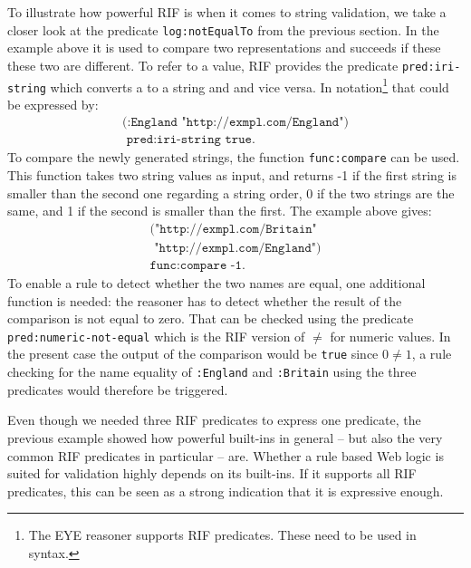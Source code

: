 To illustrate  how powerful RIF is when it comes to string validation, we take a closer look at the predicate \texttt{log:notEqualTo} from the previous section. 
In the example above it is used to compare two \uri representations and succeeds if these these two are different. To refer to a \uri value, RIF provides the predicate 
\texttt{pred:iri-string} which converts a \uri to a string and and vice versa. In \nthree notation\footnote{The EYE reasoner supports RIF predicates.
These need to be used in \nthree syntax.} 
that could be expressed by:
\begin{multline}
\texttt{(:England "http://exmpl.com/England")}\\\texttt{ pred:iri-string true.}
\end{multline}
To compare the newly generated strings, the function \texttt{func:compare} can be used. This function takes two string values as input,
and returns -1 if the first string 
is smaller
than the second one regarding a string order, 0 if the two strings are the same, and 1 if the second is smaller than the first. The example above gives:
\begin{multline}
 \texttt{("http://exmpl.com/Britain"}\\\texttt{ "http://exmpl.com/England")}\\ \texttt{func:compare -1.}
\end{multline}
\sloppy
To enable a rule to detect whether the two \uri names are equal, one additional function is needed: the reasoner has to detect whether the result of the comparison
is not equal to zero. 
That can be checked using the predicate \texttt{pred:numeric-not-equal} which is the RIF version of $\neq$ for numeric values. In the present case the output 
of the comparison would be 
\texttt{true} since $0\neq 1$, a rule checking for the name equality of \texttt{:England} and \texttt{:Britain} using the three predicates would therefore be triggered.

Even though we needed three RIF predicates to express one \nthree predicate, the previous example showed how powerful built-ins in general -- but also the very common RIF predicates
in particular -- are. Whether a rule based Web logic is suited for \rdf validation highly depends on its built-ins. If it supports all RIF predicates, this can be seen as a strong
indication that it is expressive enough.



